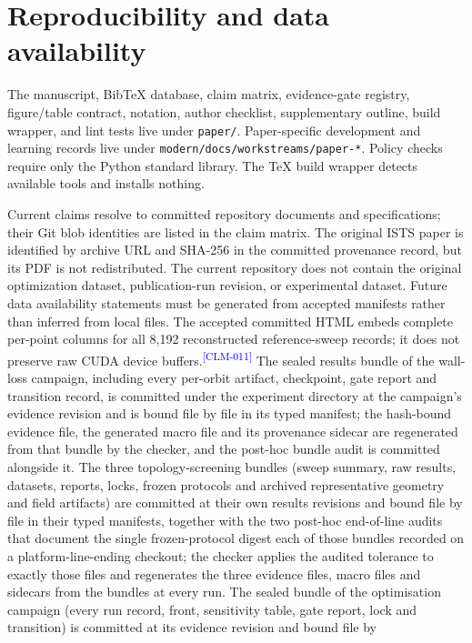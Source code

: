 \documentclass[11pt]{article}
\newcommand{\EvidenceClaim}[2]{#2\textsuperscript{\textcolor{blue}{[#1]}}}
\begin{document}
\section{Reproducibility and data availability}

The manuscript, BibTeX database, claim matrix, evidence-gate registry,
figure/table contract, notation, author checklist, supplementary outline,
build wrapper, and lint tests live under \texttt{paper/}. Paper-specific
development and learning records live under
\texttt{modern/docs/workstreams/paper-*}. Policy checks require only the
Python standard library. The TeX build wrapper detects available tools and
installs nothing.

Current claims resolve to committed repository documents and specifications;
their Git blob identities are listed in the claim matrix. The original ISTS
paper is identified by archive URL and SHA-256 in the committed provenance
record, but its PDF is not redistributed. The current repository does not
contain the original optimization dataset, publication-run revision, or
experimental dataset. Future data availability statements must be generated
from accepted manifests rather than inferred from local files.
\EvidenceClaim{CLM-011}{The accepted committed HTML embeds complete per-point
columns for all 8,192 reconstructed reference-sweep records; it does not
preserve raw CUDA device buffers.}
The sealed results bundle of the wall-loss campaign, including every per-orbit
artifact, checkpoint, gate report and transition record, is committed under
the experiment directory at the campaign's evidence revision and is bound file
by file in its typed manifest; the hash-bound evidence file, the generated
macro file and its provenance sidecar are regenerated from that bundle by the
checker, and the post-hoc bundle audit is committed alongside it. The three
topology-screening bundles (sweep summary, raw results, datasets, reports,
locks, frozen protocols and archived representative geometry and field
artifacts) are committed at their own results revisions and bound file by file
in their typed manifests, together with the two post-hoc end-of-line audits
that document the single frozen-protocol digest each of those bundles recorded
on a platform-line-ending checkout; the checker applies the audited tolerance
to exactly those files and regenerates the three evidence files, macro files
and sidecars from the bundles at every run. The sealed bundle of the
optimisation campaign (every run record, front, sensitivity table, gate report,
lock and transition) is committed at its evidence revision and bound file by
\end{document}
